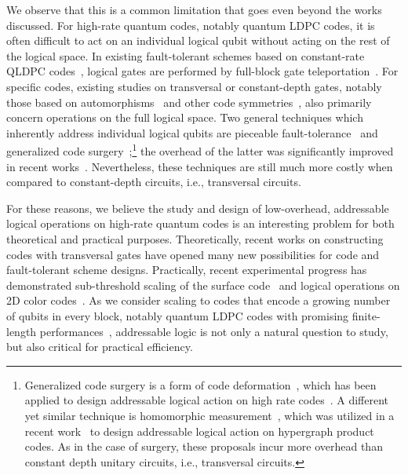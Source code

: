 \documentclass[11pt]{article}
\theoremstyle{definition}
\begin{document}
    We observe that this is a common limitation that goes even beyond the works discussed. For high-rate quantum codes, notably quantum LDPC codes, it is often difficult to act on an individual logical qubit without acting on the rest of the logical space. 
    In existing fault-tolerant schemes based on constant-rate QLDPC codes~\cite{gottesman2013fault,fawzi2020constant,tamiya2024polylog,nguyen2024quantum}, logical gates are performed by full-block gate teleportation~\cite{gottesman1999demonstrating, Knill2005}. 
    For specific codes, existing studies on transversal or constant-depth gates, notably those based on automorphisms~\cite{calderbank1998quantum,grassl2013leveraging, bravyi2024high,eberhardt2024logical,sayginel2024fault} and other code symmetries~\cite{rengaswamy2019unifying,hu2021climbing,webster2023transversal,Quintavalle2023partitioningqubits,Breuckmann2024foldtransversal}, also primarily concern operations on the full logical space. 
    Two general techniques which inherently address individual logical qubits are pieceable fault-tolerance~\cite{yoder2016universal} and generalized code surgery~\cite{cohen2022low};\footnote{Generalized code surgery is a form of code deformation~\cite{bombin2009quantum,vuillot2022quantum}, which has been applied to design addressable logical action on high rate codes~\cite{breuckmann2017hyperbolic,krishna2021fault}.
    A different yet similar technique is homomorphic measurement~\cite{huang2023homomorphic}, which was utilized in a recent work~\cite{xu2024fast} to design addressable logical action on hypergraph product codes.
    As in the case of surgery, these proposals incur more overhead than constant depth unitary circuits, i.e., transversal circuits.} the overhead of the latter was significantly improved in recent works~\cite{cross2024improved,cowtan2024ssip,williamson2024low,ide2024fault,swaroop2024universal,zhang2024time}.
    Nevertheless, these techniques are still much more costly when compared to constant-depth circuits, i.e., transversal circuits.
    
    For these reasons, we believe the study and design of low-overhead, addressable logical operations on high-rate quantum codes is an interesting problem for both theoretical and practical purposes.
    Theoretically, recent works on constructing codes with transversal gates have opened many new possibilities for code and fault-tolerant scheme designs. 
    Practically, recent experimental progress has demonstrated sub-threshold scaling of the surface code~\cite{google2023suppressing,acharya2024quantumerrorcorrectionsurface} and logical operations on 2D color codes~\cite{rodriguez2024experimental,lacroix2024scaling}. 
    As we consider scaling to codes that encode a growing number of qubits in every block, notably quantum LDPC codes with promising finite-length performances~\cite{tillich2013quantum,leverrier2015quantum,breuckmann2021quantum,panteleev2021degenerate,bravyi2024high,xu2024constant,lin2024quantum}, addressable logic is not only a natural question to study, but also critical for practical efficiency.
\end{document}

